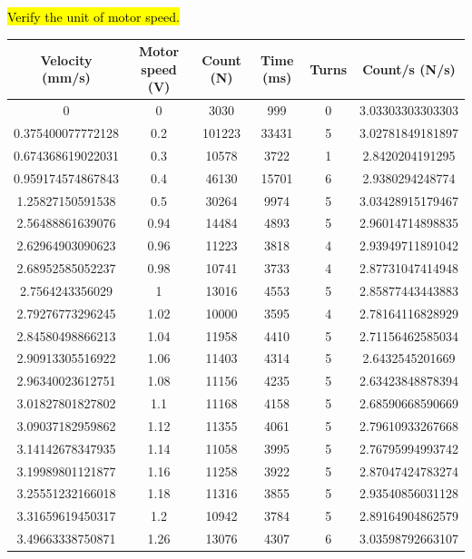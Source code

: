 \documentclass[a4paper]{report}
\numberwithin{equation}{section}
\begin{document}
\hl{Verify the unit of motor speed.}
\begin{table}[!ht]
    \centering
    \begin{tabular}{|c|c|c|c|c|c|}
    \hline
        Velocity (mm/s) & Motor speed (V) & Count (N) & Time (ms) & Turns & Count/s (N/s) \\ \hline
        0 & 0 & 3030 & 999 & 0 & 3.03303303303303 \\ \hline
        0.375400077772128 & 0.2 & 101223 & 33431 & 5 & 3.02781849181897 \\ \hline
        0.674368619022031 & 0.3 & 10578 & 3722 & 1 & 2.8420204191295 \\ \hline
        0.959174574867843 & 0.4 & 46130 & 15701 & 6 & 2.9380294248774 \\ \hline
        1.25827150591538 & 0.5 & 30264 & 9974 & 5 & 3.03428915179467 \\ \hline
        2.56488861639076 & 0.94 & 14484 & 4893 & 5 & 2.96014714898835 \\ \hline
        2.62964903090623 & 0.96 & 11223 & 3818 & 4 & 2.93949711891042 \\ \hline
        2.68952585052237 & 0.98 & 10741 & 3733 & 4 & 2.87731047414948 \\ \hline
        2.7564243356029 & 1 & 13016 & 4553 & 5 & 2.85877443443883 \\ \hline
        2.79276773296245 & 1.02 & 10000 & 3595 & 4 & 2.78164116828929 \\ \hline
        2.84580498866213 & 1.04 & 11958 & 4410 & 5 & 2.71156462585034 \\ \hline
        2.90913305516922 & 1.06 & 11403 & 4314 & 5 & 2.6432545201669 \\ \hline
        2.96340023612751 & 1.08 & 11156 & 4235 & 5 & 2.63423848878394 \\ \hline
        3.01827801827802 & 1.1 & 11168 & 4158 & 5 & 2.68590668590669 \\ \hline
        3.09037182959862 & 1.12 & 11355 & 4061 & 5 & 2.79610933267668 \\ \hline
        3.14142678347935 & 1.14 & 11058 & 3995 & 5 & 2.76795994993742 \\ \hline
        3.19989801121877 & 1.16 & 11258 & 3922 & 5 & 2.87047424783274 \\ \hline
        3.25551232166018 & 1.18 & 11316 & 3855 & 5 & 2.93540856031128 \\ \hline
        3.31659619450317 & 1.2 & 10942 & 3784 & 5 & 2.89164904862579 \\ \hline
        3.49663338750871 & 1.26 & 13076 & 4307 & 6 & 3.03598792663107 \\ \hline

\end{tabular}
\end{table}
\end{document}
